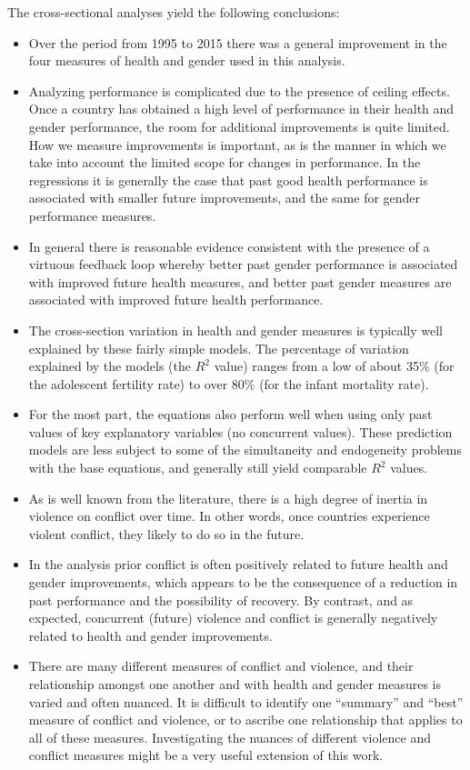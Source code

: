 \documentclass[12pt]{article}
\begin{document}
The cross-sectional analyses yield the following conclusions:
\begin{itemize}
\item Over the period from 1995 to 2015 there was a general improvement in the four measures of health and gender used in this analysis.
\item Analyzing performance is complicated due to the presence of ceiling effects. Once a country has obtained a high level of performance in their health and gender performance, the room for additional improvements is quite limited. How we measure improvements is important, as is the manner in which we take into account the limited scope for changes in performance. In the regressions it is generally the case that past good health performance is associated with smaller future improvements, and the same for gender performance measures.
\item In general there is reasonable evidence consistent with the presence of a virtuous feedback loop whereby better past gender performance is associated with improved future health measures, and better past gender measures are associated with improved future health performance.
\item The cross-section variation in health and gender measures is typically well explained by these fairly simple models. The percentage of variation explained by the models (the $R^2$ value) ranges from a low of about 35\% (for the adolescent fertility rate) to over 80\% (for the infant mortality rate).
\item For the most part, the equations also perform well when using only past values of key explanatory variables (no concurrent values). These prediction models are less subject to some of the simultaneity and endogeneity problems with the base equations, and generally still yield comparable $R^2$ values.
\item As is well known from the literature, there is a high degree of inertia in violence on conflict over time. In other words, once countries experience violent conflict, they likely to do so in the future.
\item In the analysis prior conflict is often positively related to future health and gender improvements, which appears to be the consequence of a reduction in past performance and the possibility of recovery. By contrast, and as expected, concurrent (future) violence and conflict is generally negatively related to health and gender improvements.
\item There are many different measures of conflict and violence, and their relationship amongst one another and with health and gender measures is varied and often nuanced. It is difficult to identify one \enquote{summary} and \enquote{best} measure of conflict and violence, or to ascribe one relationship that applies to all of these measures. Investigating the nuances of different violence and conflict measures might be a very useful extension of this work.

\end{itemize}
\end{document}
